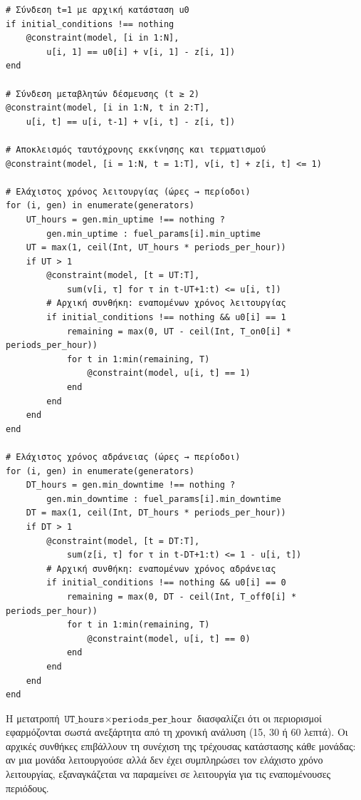 \begin{samepage}
\begin{verbatim}
# Σύνδεση t=1 με αρχική κατάσταση u0
if initial_conditions !== nothing
    @constraint(model, [i in 1:N],
        u[i, 1] == u0[i] + v[i, 1] - z[i, 1])
end

# Σύνδεση μεταβλητών δέσμευσης (t ≥ 2)
@constraint(model, [i in 1:N, t in 2:T],
    u[i, t] == u[i, t-1] + v[i, t] - z[i, t])

# Αποκλεισμός ταυτόχρονης εκκίνησης και τερματισμού
@constraint(model, [i = 1:N, t = 1:T], v[i, t] + z[i, t] <= 1)

# Ελάχιστος χρόνος λειτουργίας (ώρες → περίοδοι)
for (i, gen) in enumerate(generators)
    UT_hours = gen.min_uptime !== nothing ?
        gen.min_uptime : fuel_params[i].min_uptime
    UT = max(1, ceil(Int, UT_hours * periods_per_hour))
    if UT > 1
        @constraint(model, [t = UT:T],
            sum(v[i, τ] for τ in t-UT+1:t) <= u[i, t])
        # Αρχική συνθήκη: εναπομένων χρόνος λειτουργίας
        if initial_conditions !== nothing && u0[i] == 1
            remaining = max(0, UT - ceil(Int, T_on0[i] * periods_per_hour))
            for t in 1:min(remaining, T)
                @constraint(model, u[i, t] == 1)
            end
        end
    end
end

# Ελάχιστος χρόνος αδράνειας (ώρες → περίοδοι)
for (i, gen) in enumerate(generators)
    DT_hours = gen.min_downtime !== nothing ?
        gen.min_downtime : fuel_params[i].min_downtime
    DT = max(1, ceil(Int, DT_hours * periods_per_hour))
    if DT > 1
        @constraint(model, [t = DT:T],
            sum(z[i, τ] for τ in t-DT+1:t) <= 1 - u[i, t])
        # Αρχική συνθήκη: εναπομένων χρόνος αδράνειας
        if initial_conditions !== nothing && u0[i] == 0
            remaining = max(0, DT - ceil(Int, T_off0[i] * periods_per_hour))
            for t in 1:min(remaining, T)
                @constraint(model, u[i, t] == 0)
            end
        end
    end
end
\end{verbatim}
\end{samepage}

Η μετατροπή $\texttt{UT\_hours} \times \texttt{periods\_per\_hour}$ διασφαλίζει ότι οι περιορισμοί εφαρμόζονται σωστά ανεξάρτητα από τη χρονική ανάλυση (15, 30 ή 60 λεπτά). Οι αρχικές συνθήκες επιβάλλουν τη συνέχιση της τρέχουσας κατάστασης κάθε μονάδας: αν μια μονάδα λειτουργούσε αλλά δεν έχει συμπληρώσει τον ελάχιστο χρόνο λειτουργίας, εξαναγκάζεται να παραμείνει σε λειτουργία για τις εναπομένουσες περιόδους.

